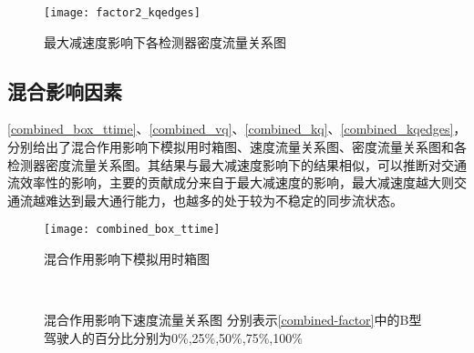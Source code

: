 \begin{figure}[htb]
\begin{center}
\texttt{[image: factor2\_kqedges]}
\caption{最大减速度影响下各检测器密度流量关系图}
\label{factor2_kqedges}
\end{center}
\end{figure}

\FloatBarrier

\subsection{混合影响因素}

\autoref{combined_box_ttime}、\autoref{combined_vq}、\autoref{combined_kq}、\autoref{combined_kqedges}，分别给出了混合作用影响下模拟用时箱图、速度流量关系图、密度流量关系图和各检测器密度流量关系图。其结果与最大减速度影响下的结果相似，可以推断对交通流效率性的影响，主要的贡献成分来自于最大减速度的影响，最大减速度越大则交通流越难达到最大通行能力，也越多的处于较为不稳定的同步流状态。

\begin{figure}[htb]
\begin{center}
\texttt{[image: combined\_box\_ttime]}
\caption{混合作用影响下模拟用时箱图}
\label{combined_box_ttime}
\end{center}
\end{figure}



\begin{figure}[htb]%
\centering
{}%
\\%
%
\caption[A set of four sub-floats.]{混合作用影响下速度流量关系图
分别表示\autoref{combined-factor}中的B型驾驶人的百分比分别为0\%,25\%,50\%,75\%,100\%}%
\label{combined_vq}%
\end{figure}


